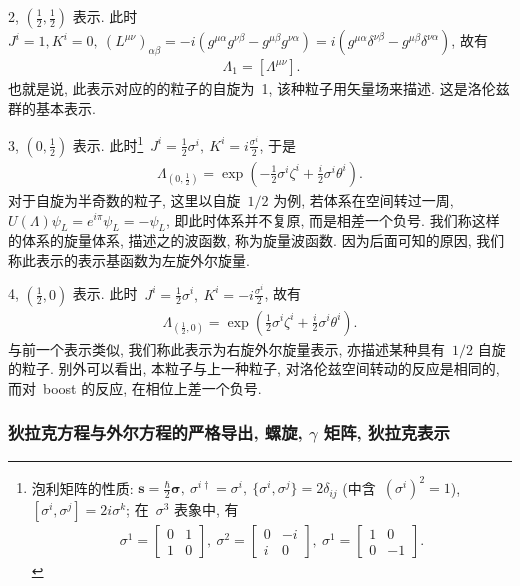2, $(\frac{1}{2},\frac{1}{2})$ 表示. 此时~$J^i=1, K^i=0,~(L^{\mu\nu})_{\alpha\beta}=-i(g^{\mu\alpha}g^{\nu\beta}-g^{\mu\beta}g^{\nu\alpha})=i(g^{\mu\alpha}\delta^{\nu\beta}-g^{\mu\beta}\delta^{\nu\alpha})$, 故有
\begin{align}
~\Lambda_{1}=[\Lambda^{\mu\nu}].
\end{align}
也就是说, 此表示对应的的粒子的自旋为~1, 该种粒子用矢量场来描述. 这是洛伦兹群的基本表示.

3, $(0,\frac{1}{2})$ 表示. 此时\footnote{泡利矩阵的性质: $\bm{s}=\frac{\hbar}{2}\bm{\sigma},~\sigma^{i\dag}=\sigma^i,~\{\sigma^i,\sigma^j\}=2\delta_{ij}$ (中含~$(\sigma^i)^2=1$),~$[\sigma^i,\sigma^j]=2i\sigma^k$; 在~$\sigma^3$ 表象中, 有
\begin{align}
\sigma^1=\left[\begin{array}{cc}0&1\\1&0\end{array}\right],~
\sigma^2=\left[\begin{array}{cc}0&-i\\i&0\end{array}\right],~
\sigma^1=\left[\begin{array}{cc}1&0\\0&-1\end{array}\right].
\end{align}
}~$J^i=\frac{1}{2}\sigma^i,~K^i=i\frac{\sigma^i}{2}$, 于是
\begin{align}
\Lambda_{(0,\frac{1}{2})}=\exp\left(-\frac{1}{2}\sigma^i\zeta^i+\frac{i}{2}\sigma^i\theta^i\right).
\end{align}
对于自旋为半奇数的粒子, 这里以自旋~$1/2$ 为例, 若体系在空间转过一周, $U(\Lambda)\psi_L=e^{i\pi}\psi_L=-\psi_L$, 即此时体系并不复原, 而是相差一个负号. 我们称这样的体系的旋量体系, 描述之的波函数, 称为旋量波函数. 因为后面可知的原因, 我们称此表示的表示基函数为左旋外尔旋量.


4, $(\frac{1}{2},0)$ 表示. 此时~$J^i=\frac{1}{2}\sigma^i,~K^i=-i\frac{\sigma^i}{2}$, 故有
\begin{align}
\Lambda_{(\frac{1}{2},0)}=\exp\left(\frac{1}{2}\sigma^i\zeta^i+\frac{i}{2}\sigma^i\theta^i\right).
\end{align}
与前一个表示类似, 我们称此表示为右旋外尔旋量表示, 亦描述某种具有~$1/2$ 自旋的粒子. 别外可以看出, 本粒子与上一种粒子, 对洛伦兹空间转动的反应是相同的, 而对~boost 的反应, 在相位上差一个负号.


\subsubsection{狄拉克方程与外尔方程的严格导出, 螺旋, $\gamma$ 矩阵, 狄拉克表示}

